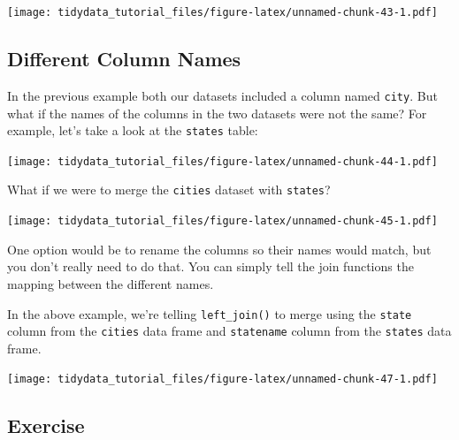 \documentclass[]{article}
\newenvironment{Shaded}{\begin{snugshade}}{\end{snugshade}}
\newcommand{\KeywordTok}[1]{\textcolor[rgb]{0.13,0.29,0.53}{\textbf{{#1}}}}
\newcommand{\DataTypeTok}[1]{\textcolor[rgb]{0.13,0.29,0.53}{{#1}}}
\newcommand{\StringTok}[1]{\textcolor[rgb]{0.31,0.60,0.02}{{#1}}}
\newcommand{\NormalTok}[1]{{#1}}
\theoremstyle{definition}
\theoremstyle{definition}
\theoremstyle{definition}
\theoremstyle{remark}
\begin{document}
\begin{Shaded}
\end{Shaded}

\texttt{[image: tidydata\_tutorial\_files/figure-latex/unnamed-chunk-43-1.pdf]}

\subsection{Different Column Names}\label{different-column-names}

In the previous example both our datasets included a column named
\texttt{city}. But what if the names of the columns in the two datasets
were not the same? For example, let's take a look at the \texttt{states}
table:

\texttt{[image: tidydata\_tutorial\_files/figure-latex/unnamed-chunk-44-1.pdf]}

What if we were to merge the \texttt{cities} dataset with
\texttt{states}?

\texttt{[image: tidydata\_tutorial\_files/figure-latex/unnamed-chunk-45-1.pdf]}

One option would be to rename the columns so their names would match,
but you don't really need to do that. You can simply tell the join
functions the mapping between the different names.

\begin{Shaded}
\end{Shaded}

In the above example, we're telling \texttt{left\_join()} to merge using
the \texttt{state} column from the \texttt{cities} data frame and
\texttt{statename} column from the \texttt{states} data frame.

\texttt{[image: tidydata\_tutorial\_files/figure-latex/unnamed-chunk-47-1.pdf]}

\subsection{Exercise}\label{exercise-5}
\end{document}
